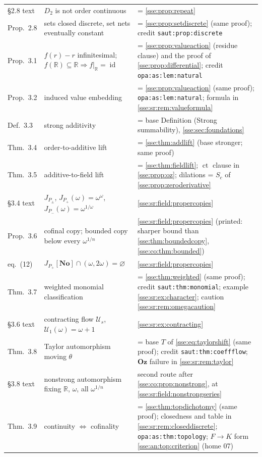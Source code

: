 \documentclass[11pt,a4paper]{article}
\numberwithin{equation}{section}
\theoremstyle{plain}
\theoremstyle{definition}
\theoremstyle{remark}
\newcommand{\No}{\mathbf{No}}
\newcommand{\Oz}{\mathbf{Oz}}
\newcommand{\R}{\mathbb{R}}
\newcommand{\id}{\operatorname{id}}
\newcommand{\lbl}[1]{\nolinkurl{#1}}%
\newcommand{\ctsr}{\operatorname{ct}}%
\begin{document}
\begin{longtable}{P{17mm}P{52mm}P{79mm}}
\S2.8 text & $D_2$ is not order continuous & = \cref{sse:prop:repeat} \\
Prop.~2.8 & sets closed discrete, set nets eventually constant & = \cref{sse:prop:setdiscrete} (same proof); credit \lbl{saut:prop:discrete} \\
Prop.~3.1 & $f(r)-r$ infinitesimal; $f(\R)\subseteq\R\Rightarrow f|_\R=\id$ & = \cref{sse:prop:valueaction} (residue clause) and the proof of \cref{sse:prop:differential}; credit \lbl{opa:as:lem:natural} \\
Prop.~3.2 & induced value embedding & = \cref{sse:prop:valueaction} (same proof); \lbl{opa:as:lem:natural}; formula in \cref{sse:sr:rem:valueformula} \\
Def.~3.3 & strong additivity & = base Definition (Strong summability), \cref{sse:sec:foundations} \\
Thm.~3.4 & order-to-additive lift & = \cref{sse:thm:addlift} (base stronger; same proof) \\
Thm.~3.5 & additive-to-field lift & = \cref{sse:thm:fieldlift}; $\ctsr$ clause in \cref{sse:prop:oz}; dilations = $S_c$ of \cref{sse:prop:zeroderivative} \\
\S3.4 text & $J_{P_\pm}$, $J_{P_+}(\omega)=\omega^\omega$, $J_{P_-}(\omega)=\omega^{1/\omega}$ & \cref{sse:sr:field:propercopies} \\
Prop.~3.6 & cofinal copy; bounded copy below every $\omega^{1/n}$ & \cref{sse:sr:field:propercopies} (printed: sharper bound than \cref{sse:thm:boundedcopy}, \cref{sse:co:thm:bounded}) \\
eq.~(12) & $J_{P_+}[\No]\cap(\omega,2\omega)=\varnothing$ & \cref{sse:sr:field:propercopies} \\
Thm.~3.7 & weighted monomial classification & = \cref{sse:thm:weighted} (same proof); credit \lbl{saut:thm:monomial}; example \cref{sse:sr:ex:character}; caution \cref{sse:sr:rem:omegacaution} \\
\S3.6 text & contracting flow $\mathcal U_s$, $\mathcal U_1(\omega)=\omega+1$ & \cref{sse:sr:ex:contracting} \\
Thm.~3.8 & Taylor automorphism moving $\theta$ & = base $T$ of \eqref{sse:eq:taylorshift} (same proof); credit \lbl{saut:thm:coeffflow}; $\Oz$ failure in \cref{sse:sr:rem:taylor} \\
\S3.8 text & nonstrong automorphism fixing $\R$, $\omega$, all $\omega^{1/n}$ & second route after \cref{sse:co:prop:nonstrong}, at \eqref{sse:sr:field:nonstrongseries} \\
Thm.~3.9 & continuity $\iff$ cofinality & = \cref{sse:thm:topdichotomy} (same proof); closedness and table in \cref{sse:sr:rem:closeddiscrete}; \lbl{opa:as:thm:topology}; $F\to K$ form \cref{sse:an:top:criterion} (home 07) \\

\end{longtable}
\end{document}
